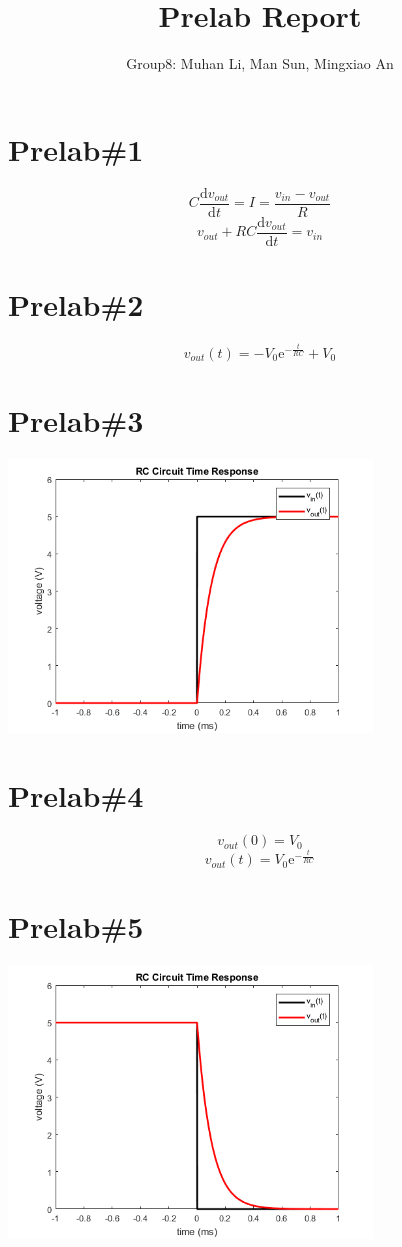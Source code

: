 \documentclass{IEEEtran}
\title{Prelab Report}
\author{Group8: Muhan Li, Man Sun, Mingxiao An}
\begin{document}
	\maketitle
	\section{Prelab\#1}
	\begin{equation}
		C\frac{\mathrm{d}v_{out}}{\mathrm{d}t}=I=\frac{v_{in} - v_{out}}{R}
	\end{equation}
	\begin{equation}
		v_{out} + RC\frac{\mathrm{d}v_{out}}{\mathrm{d}t} = v_{in}
	\end{equation}
	\section{Prelab\#2}
	\begin{equation}
		v_{out}(t) = -V_0\mathrm{e}^{-\frac{t}{RC}} + V_0
	\end{equation}
	\section{Prelab\#3}
		\includegraphics[width=3.8in]{images/Prelab3.png}
	\section{Prelab\#4}
	\begin{equation}
		v_{out}(0) = V_0
	\end{equation}
	\begin{equation}
		v_{out}(t) = V_0\mathrm{e}^{-\frac{t}{RC}}
	\end{equation}
	\section{Prelab\#5}
		\includegraphics[width=3.8in]{images/Prelab5.png}
\end{document}
